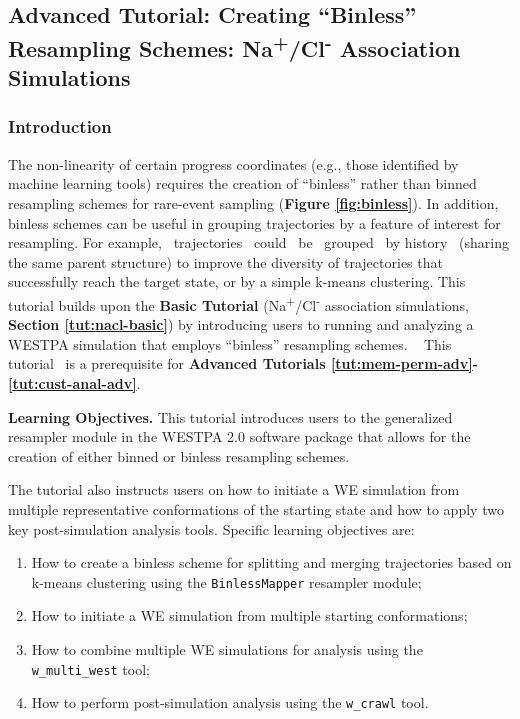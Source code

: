 \subsection{Advanced Tutorial: Creating “Binless” Resampling Schemes: Na\textsuperscript{+}/Cl\textsuperscript{-} Association Simulations}
\label{tut:binless}


\subsubsection{Introduction}
The non-linearity of certain progress coordinates (e.g., those identified by machine learning tools) requires the creation of “binless” rather than binned resampling schemes for rare-event sampling (\textbf{Figure \ref{fig:binless}}). 
In addition, binless schemes can be useful in grouping trajectories by a feature of interest for resampling. 
For example,~ trajectories~ could~ be~ grouped~ by history~ (sharing the same parent structure) to improve the diversity of trajectories that successfully reach the target state, or by a simple k-means clustering. 
This tutorial builds upon the \textbf{Basic Tutorial} (Na\textsuperscript{+}/Cl\textsuperscript{-} association simulations, \textbf{Section \ref{tut:nacl-basic}}) by introducing users to running and analyzing a WESTPA simulation that employs “binless” resampling schemes.
~ This~ tutorial~ is a prerequisite for \textbf{Advanced Tutorials \ref{tut:mem-perm-adv}-\ref{tut:cust-anal-adv}}. 

\textbf{Learning Objectives.} This tutorial introduces users to the generalized resampler module in the WESTPA 2.0 software package that allows for the creation of either binned or binless resampling schemes.

The tutorial also instructs users on how to initiate a WE simulation from multiple representative conformations of the starting state and how to apply two key post-simulation analysis tools. 
Specific learning objectives are:
\begin{enumerate}
    \item How to create a binless scheme for splitting and merging trajectories based on k-means clustering using the \verb|BinlessMapper| resampler module;
    \item How to initiate a WE simulation from multiple starting conformations;
    \item How to combine multiple WE simulations for analysis using the \verb|w_multi_west| tool;
    \item How to perform post-simulation analysis using the \verb|w_crawl| tool.
\end{enumerate}

